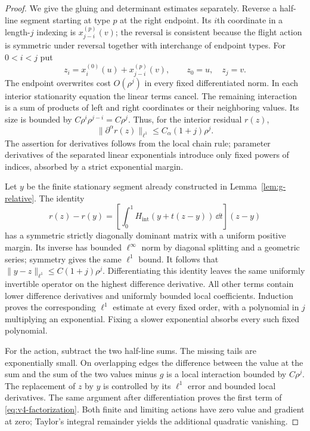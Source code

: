 \begin{proof}
We give the gluing and determinant estimates separately. Reverse a
half-line segment starting at type $p$ at the right endpoint. Its
$i$th coordinate in a length-$j$ indexing is $x_{j-i}^{(p)}(v)$;
the reversal is consistent because the flight action is symmetric
under reversal together with interchange of endpoint types. For
$0<i<j$ put
\[
 z_i=x_i^{(0)}(u)+x_{j-i}^{(p)}(v),\qquad z_0=u,\quad z_j=v.
\]
The endpoint overwrites cost $O(\rho^j)$ in every fixed differentiated
norm. In each interior stationarity equation the linear terms cancel.
The remaining interaction is a sum of products of left and right
coordinates or their neighboring values. Its size is bounded by
$C\rho^i\rho^{j-i}=C\rho^j$. Thus, for the interior residual $r(z)$,
\begin{equation}\label{eq:v4-gluing-residual}
 \|\partial^\alpha r(z)\|_{\ell^1}
                          \le C_\alpha(1+j)\rho^j.
\end{equation}
The assertion for derivatives follows from the local chain rule;
parameter derivatives of the separated linear exponentials introduce
only fixed powers of indices, absorbed by a strict exponential margin.

Let $y$ be the finite stationary segment already constructed in
Lemma~\ref{lem:g-relative}. The identity
\[
 r(z)-r(y)=\left[\int_0^1 H_{\mathrm{int}}(y+t(z-y))\,\dd t\right](z-y)
\]
has a symmetric strictly diagonally dominant matrix with a uniform
positive margin. Its inverse has bounded $\ell^\infty$ norm by diagonal
splitting and a geometric series; symmetry gives the same $\ell^1$
bound. It follows that $\|y-z\|_{\ell^1}\le C(1+j)\rho^j$.
Differentiating this identity leaves the same uniformly invertible
operator on the highest difference derivative. All other terms contain
lower difference derivatives and uniformly bounded local coefficients.
Induction proves the corresponding $\ell^1$ estimate at every fixed
order, with a polynomial in $j$ multiplying an exponential. Fixing a
slower exponential absorbs every such fixed polynomial.

For the action, subtract the two half-line sums. The missing tails are
exponentially small. On overlapping edges the difference between the
value at the sum and the sum of the two values minus $g$ is a local
interaction bounded by $C\rho^j$. The replacement of $z$ by $y$ is
controlled by its $\ell^1$ error and bounded local derivatives.
The same argument after differentiation proves the first term of
\eqref{eq:v4-factorization}. Both finite and limiting actions have
zero value and gradient at zero; Taylor's integral remainder yields
the additional quadratic vanishing.


\end{proof}
